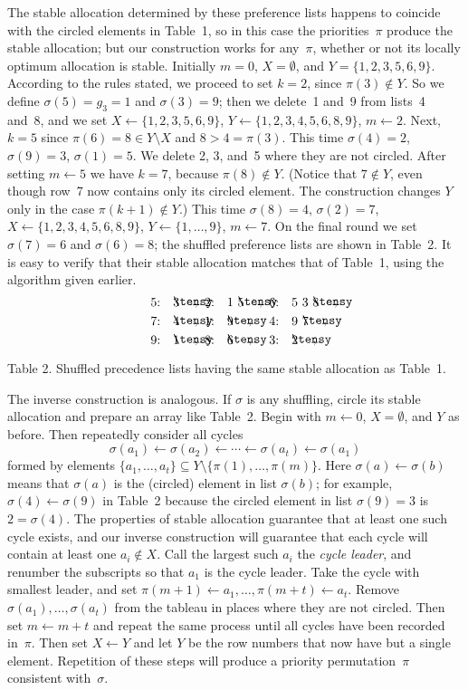 The stable allocation determined by these preference lists happens to coincide
with 
the circled elements in Table~1, so in this case 
the priorities~$\pi$ produce the stable
allocation; but our construction works for any~$\pi$, whether or not its
locally optimum allocation is stable. Initially $m=0$, $X=\emptyset$, and
$Y=\{1,2,3,5,6,9\}$. According to the rules stated, we proceed to
set $k=2$, since $\pi(3)\not\in Y$. So we define $\sigma(5)=g_3=1$ and
$\sigma(3)=9$; then we delete~1 and~9 from lists~4 and~8, and we set
$X\leftarrow \{1,2,3,5,6,9\}$, $Y\leftarrow\{1,2,3,4,5,6,8,9\}$, $m\leftarrow
2$. Next, $k=5$ since $\pi(6)=8\in Y\setminus X$ and $8>4=\pi(3)$. This time
$\sigma(4)=2$, $\sigma(9)=3$, $\sigma(1)=5$. We delete 2, 3, and~5 where they
are not circled. After setting $m\leftarrow 5$ we have $k=7$, because
$\pi(8)\not\in Y$. (Notice that $7\not\in Y$, even though row~7 now contains
only its circled element. The construction changes $Y$ only in the case
$\pi(k+1)\not\in Y$.) This time $\sigma(8)=4$, $\sigma(2)=7$, $X\leftarrow
\{1,2,3,4,5,6,8,9\}$, $Y\leftarrow\{1,\ldots,9\}$, $m\leftarrow 7$. On the
final round we set $\sigma(7)=6$ and $\sigma(6)=8$; the shuffled preference
lists are shown in Table~2. It is easy to verify that their stable allocation
matches that of Table~1, using the algorithm given earlier.
$$\vcenter{\halign{#\hfil\quad&$#$\hfil\qquad
&#\hfil\quad&$#$\hfil\ &$#$\hfil\qquad
&#\hfil\quad&$#$\hfil\ &$#$\hfil\ &$#$\hfil\cr
5:&\cd3&2:&1&\cd5&6:&5&3&\cd8\cr
\noalign{\smallskip}
7:&\cd4&1:&\cd9&&4:&9&\cd7\cr
\noalign{\smallskip} 
9:&\cd1&8:&\cd6&&3:&\cd2\cr}}$$
\centerline{Table 2. Shuffled precedence lists having the same stable
allocation as Table~1.}

The inverse construction is analogous. If $\sigma$ is any shuffling, circle its
stable allocation and prepare an array like Table~2. Begin with $m\leftarrow
0$, $X=\emptyset$, and $Y$ as before. Then repeatedly consider all cycles
$$\sigma(a_1)\leftarrow \sigma(a_2)\leftarrow
\cdots\leftarrow\sigma(a_t)\leftarrow\sigma(a_1)$$
formed by elements $\{a_1,\ldots,a_t\}\subseteq Y\setminus\{\pi(1),\ldots,
\pi(m)\}$. Here $\sigma(a)\leftarrow\sigma(b)$ means that $\sigma(a)$ is the
(circled) element in list $\sigma(b)$; for example,
$\sigma(4)\leftarrow\sigma(9)$ in Table~2 because the circled element in list
$\sigma(9)=3$ is $2=\sigma(4)$.
The properties of stable allocation guarantee that at least one such cycle
exists, and our inverse construction will guarantee that each cycle will
contain at least one $a_i\not\in X$. Call the largest such $a_i$ the {\it cycle
leader}, and renumber the subscripts so that $a_1$ is the cycle leader. Take
the cycle with smallest leader, and set $\pi(m+1)\leftarrow
a_1,\ldots,\pi(m+t)\leftarrow a_t$. 
Remove $\sigma(a_1),\ldots,\sigma(a_t)$ from the tableau in places where they
are not circled.
Then set $m\leftarrow m+t$ and repeat the same process until all cycles have
been recorded in~$\pi$. Then set $X\leftarrow Y$ and let $Y$ be the row numbers
that now have but a single element. Repetition of these steps will produce a
priority permutation~$\pi$ consistent with~$\sigma$. 

